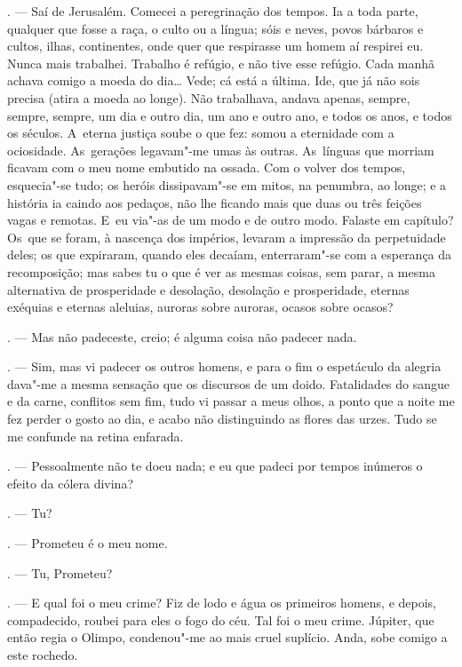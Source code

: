 \begin{linenumbers}
\begin{Parskip}
. --- Saí de Jerusalém. Comecei a peregrinação dos tempos. Ia a
toda parte, qualquer que fosse a raça, o culto ou a língua; sóis e
neves, povos bárbaros e cultos, ilhas, continentes, onde quer que
respirasse um homem aí respirei eu. Nunca mais trabalhei. Trabalho é
refúgio, e não tive esse refúgio. Cada manhã achava comigo a moeda do
dia\ldots{} Vede; cá está a última. Ide, que já não sois precisa (atira a
moeda ao longe). Não trabalhava, andava apenas, sempre, sempre, sempre,
um dia e outro dia, um ano e outro ano, e todos os anos, e todos os
séculos. A~eterna justiça soube o que fez: somou a eternidade com a
ociosidade. As~gerações legavam"-me umas às outras. As~línguas que
morriam ficavam com o meu nome embutido na ossada. Com o volver dos
tempos, esquecia"-se tudo; os heróis dissipavam"-se em mitos, na penumbra,
ao longe; e a história ia caindo aos pedaços, não lhe ficando mais que
duas ou três feições vagas e remotas. E~eu via"-as de um modo e de outro
modo. Falaste em capítulo? Os~que se foram, à nascença dos impérios,
levaram a impressão da perpetuidade deles; os que expiraram, quando eles
decaíam, enterraram"-se com a esperança da recomposição; mas sabes tu o
que é ver as mesmas coisas, sem parar, a mesma alternativa de
prosperidade e desolação, desolação e prosperidade, eternas exéquias e
eternas aleluias, auroras sobre auroras, ocasos sobre ocasos?

. --- Mas não padeceste, creio; é alguma coisa não padecer nada.

. --- Sim, mas vi padecer os outros homens, e para o fim o
espetáculo da alegria dava"-me a mesma sensação que os discursos de um
doido. Fatalidades do sangue e da carne, conflitos sem fim, tudo vi
passar a meus olhos, a ponto que a noite me fez perder o gosto ao dia, e
acabo não distinguindo as flores das urzes. Tudo se me confunde na
retina enfarada.

. --- Pessoalmente não te doeu nada; e eu que padeci por tempos
inúmeros o efeito da cólera divina?

. --- Tu?

. --- Prometeu é o meu nome.

. --- Tu, Prometeu?

. --- E qual foi o meu crime? Fiz de lodo e água os primeiros
homens, e depois, compadecido, roubei para eles o fogo do céu. Tal foi o
meu crime. Júpiter, que então regia o Olimpo, condenou"-me ao mais cruel
suplício. Anda, sobe comigo a este rochedo.


\end{Parskip}
\end{linenumbers}
